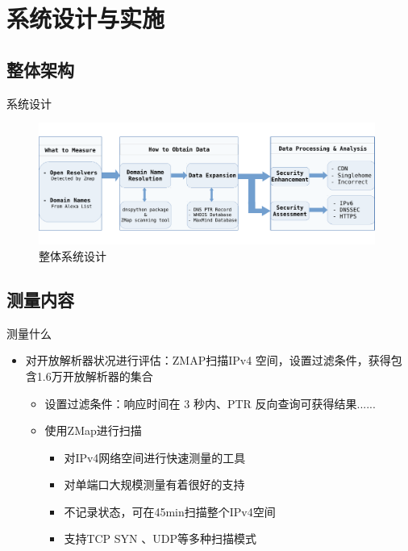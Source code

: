 \documentclass{beamer}
\begin{document}
\section{系统设计与实施}
\subsection{整体架构}
\begin{frame}{系统设计}

  \begin{figure}
    \includegraphics[height=4cm]{figures/sysoverview.pdf}
    \caption{整体系统设计}
  \end{figure}
\end{frame}
\subsection{测量内容}

\begin{frame}{测量什么}
  \begin{itemize}
    \item 对开放解析器状况进行评估：ZMAP扫描IPv4 空间，设置过滤条件，获得包含1.6万开放解析器的集合
    \begin{itemize}
      \item 设置过滤条件：响应时间在 3 秒内、PTR 反向查询可获得结果......
      \item 使用ZMap进行扫描
      \begin{itemize}
        \item 对IPv4网络空间进行快速测量的工具
          \item 对单端口大规模测量有着很好的支持
          \item 不记录状态，可在45min扫描整个IPv4空间
          \item 支持TCP SYN 、UDP等多种扫描模式
      \end{itemize}
    \end{itemize}

  \end{itemize}

\end{frame}
\end{document}
